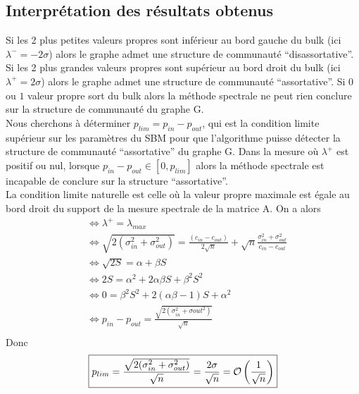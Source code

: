 \subsection{Interprétation des résultats obtenus}
\label{subsec:1.3}
Si les 2 plus petites valeurs propres sont inférieur au bord gauche du bulk (ici $\lambda^- = -2\sigma$) alors le graphe admet une structure de communauté ``disassortative''.
Si les 2 plus grandes valeurs propres sont supérieur au bord droit du bulk (ici $\lambda^+ = 2\sigma$) alors le graphe admet une structure de communauté ``assortative''.
Si $0$ ou $1$ valeur propre sort du bulk alors la méthode spectrale ne peut rien conclure sur la structure de communauté du graphe G.\\

Nous cherchons à déterminer $p_{lim} = p_{in} - p_{out}$, qui est la condition limite supérieur sur les paramètres du SBM pour que l'algorithme puisse détecter la structure de communauté ``assortative'' du graphe G.
Dans la mesure où  $\lambda^+$ est positif ou nul, lorsque $p_{in} - p_{out} \in [0, p_{lim}]$ alors la méthode spectrale est incapable de conclure sur la structure ``assortative''.\\
 
La condition limite naturelle est celle où la valeur propre maximale est égale au bord droit du support de la mesure spectrale de la matrice A.
On a alors 
\begin{align*}
	&\Leftrightarrow \lambda^+ = \lambda_{max}\\
	&\Leftrightarrow \sqrt{2(\sigma_{in}^2 + \sigma_{out}^2)} = \frac{(c_{in} - c_{out})}{2\sqrt{n}} + \sqrt{n}\frac{\sigma_{in}^2 + \sigma_{out}^2}{c_{in} - c_{out}}\\
	&\Leftrightarrow \sqrt{2S} = \alpha + \beta S\\
	&\Leftrightarrow 2S = \alpha^2 + 2\alpha \beta S +\beta^2 S^2\\
	&\Leftrightarrow 0 = \beta^2 S^2 + 2(\alpha \beta - 1)S+ \alpha^2 \\
	&\Leftrightarrow p_{in} - p_{out} = \frac{\sqrt{2(\sigma_{in}^2 + \sigma{out}^2)}}{\sqrt{n}}  \\
\end{align*}
Donc
\begin{equation}
	\boxed{p_{lim} = \frac{\sqrt{2(\sigma_{in}^2 + \sigma_{out}^2)}}{\sqrt{n}}= \frac{2\sigma}{\sqrt{n}} = \mathcal{O}\left(\frac{1}{\sqrt{n}}\right)}\\
\end{equation}

